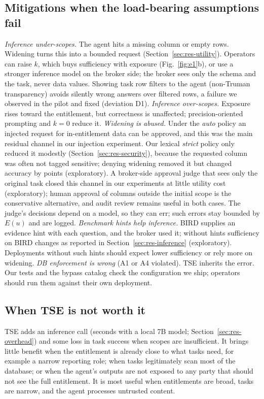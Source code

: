 \subsection{Mitigations when the load-bearing assumptions fail}
\emph{Inference under-scopes.} The agent hits a missing column or empty rows. Widening turns this into a
bounded request (Section~\ref{sec:res-utility}). Operators can raise $k$, which buys sufficiency with exposure
(Fig.~\ref{fig:e1}b), or use a stronger inference model on the broker side; the broker sees only the schema and the
task, never data values. Showing task row filters to the agent (non-Truman transparency) avoids silently wrong
answers over filtered rows, a failure we observed in the pilot and fixed (deviation D1).
\emph{Inference over-scopes.} Exposure rises toward the entitlement, but correctness is unaffected; precision-oriented
prompting and $k{=}0$ reduce it.
\emph{Widening is abused.} Under the \emph{auto} policy an injected request for in-entitlement data can be approved,
and this was the main residual channel in our injection experiment. Our lexical \emph{strict} policy only reduced it
modestly (Section~\ref{sec:res-security}), because the requested column was often not tagged sensitive; denying
widening removed it but changed accuracy by \ablDDeny{} points (exploratory). A broker-side approval judge that sees only
the original task closed this channel in our experiments at little utility cost (exploratory); human approval of
columns outside the initial scope is the conservative alternative, and audit review remains useful in both cases.
The judge's decisions depend on a model, so they can err; such errors stay bounded by $E(u)$ and are logged.
\emph{Benchmark hints help inference.} BIRD supplies an evidence hint with each question, and the broker used it; without hints sufficiency on BIRD changes as reported in Section~\ref{sec:res-inference} (exploratory). Deployments without such hints should expect lower sufficiency or rely more on widening.
\emph{DB enforcement is wrong} (A1 or A4 violated). TSE inherits the error. Our tests and the bypass catalog check
the configuration we ship; operators should run them against their own deployment.

\subsection{When TSE is not worth it}
TSE adds an inference call (seconds with a local 7B model; Section~\ref{sec:res-overhead}) and some loss in task
success when scopes are insufficient. It brings little benefit when the entitlement is already close to what
tasks need, for example a narrow reporting role; when tasks legitimately scan most of the database; or when the
agent's outputs are not exposed to any party that should not see the full entitlement. It is most useful when
entitlements are broad, tasks are narrow, and the agent processes untrusted content.

